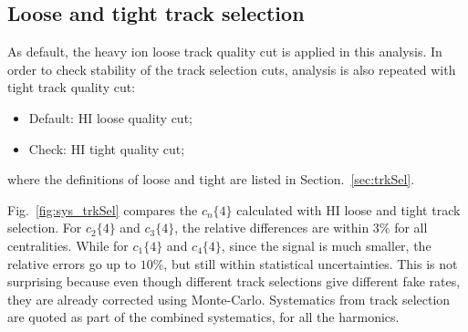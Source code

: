 \subsection{Loose and tight track selection}
As default, the heavy ion loose track quality cut is applied in this analysis. In order to check stability of the track selection cuts, analysis is also repeated with tight track quality cut:
\begin{itemize}
\item Default: HI loose quality cut;
\item Check: HI tight quality cut;
\end{itemize}
where the definitions of loose and tight are listed in Section.~\ref{sec:trkSel}.

Fig.~\ref{fig:sys_trkSel} compares the $c_n\{4\}$ calculated with HI loose and tight track selection. For $c_2\{4\}$ and $c_3\{4\}$, the relative differences are within $3\%$ for all centralities. While for $c_1\{4\}$ and $c_4\{4\}$, since the signal is much smaller, the relative errors go up to $10\%$, but still within statistical uncertainties. This is not surprising because even though different track selections give different fake rates, they are already corrected using Monte-Carlo. Systematics from track selection are quoted as part of the combined systematics, for all the harmonics.
